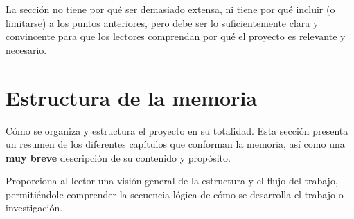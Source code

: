 La sección no tiene por qué ser demasiado extensa, ni tiene por qué incluir (o limitarse) a los puntos anteriores, pero debe ser lo suficientemente clara y convincente para que los lectores comprendan por qué el proyecto es relevante y necesario.

\section{Estructura de la memoria}

Cómo se organiza y estructura el proyecto en su totalidad. Esta sección presenta un resumen de los diferentes capítulos que conforman la memoria, así como una \textbf{muy breve} descripción de su contenido y propósito.

Proporciona al lector una visión general de la estructura y el flujo del trabajo, permitiéndole comprender la secuencia lógica de cómo se desarrolla el trabajo o investigación.